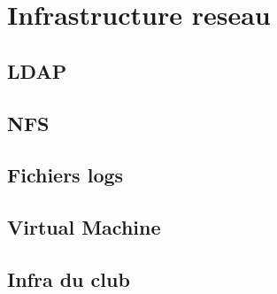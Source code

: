 \documentclass[a4paper]{report}
\begin{document}
\chapter{Infrastructure reseau}
  \section{LDAP}
    
  \section{NFS}
    
  \section{Fichiers logs}
    
  \section{Virtual Machine}
    
  \section{Infra du club}
    
\end{document}

